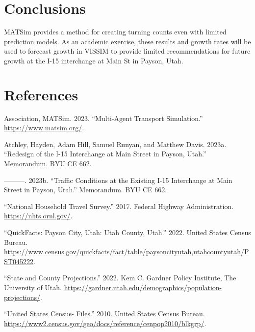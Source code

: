 \documentclass[
  letterpaper,
  DIV=11,
  numbers=noendperiod]{scrartcl}
\newlength{\cslhangindent}
\newlength{\cslentryspacingunit} %
\newenvironment{CSLReferences}[2] %
 {%
  \setlength{\parindent}{0pt}
  \ifodd #1
  \let\oldpar\par
  \def\par{\hangindent=\cslhangindent\oldpar}
  \fi
  \setlength{\parskip}{#2\cslentryspacingunit}
 }%
 {}
\begin{document}
\hypertarget{conclusions}{%
\section{Conclusions}\label{conclusions}}

MATSim provides a method for creating turning counts even with limited
prediction models. As an academic exercise, these results and growth
rates will be used to forecast growth in VISSIM to provide limited
recommendations for future growth at the I-15 interchange at Main St in
Payson, Utah.

\hypertarget{references}{%
\section{References}\label{references}}

\hypertarget{refs}{}
\begin{CSLReferences}{1}{0}
\leavevmode{}%
Association, MATSim. 2023. {``Multi-Agent Transport Simulation.''}
\url{https://www.matsim.org/}.

\leavevmode{}%
Atchley, Hayden, Adam Hill, Samuel Runyan, and Matthew Davis. 2023a.
{``{Redesign} of the {I}-15 {Interchange} at {Main} {Street} in
{Payson}, {Utah}.''} Memorandum. BYU CE 662.

\leavevmode{}%
---------. 2023b. {``Traffic {Conditions} at the {Existing} {I}-15
{Interchange} at {Main} {Street} in {Payson}, {Utah}.''} Memorandum. BYU
CE 662.

\leavevmode{}%
{``National {Household} {Travel} {Survey}.''} 2017. Federal Highway
Administration. \url{https://nhts.ornl.gov/}.

\leavevmode{}%
{``{QuickFacts}: {Payson} City, {Utah}: {Utah} {County}, {Utah}.''}
2022. United States Census Bureau.
\url{https://www.census.gov/quickfacts/fact/table/paysoncityutah,utahcountyutah/PST045222}.

\leavevmode{}%
{``State and {County} {Projections}.''} 2022. Kem C. Gardner Policy
Institute, The University of Utah.
\url{https://gardner.utah.edu/demographics/population-projections/}.

\leavevmode{}%
{``United {States} {Census}- {Files}.''} 2010. United States Census
Bureau.
\url{https://www2.census.gov/geo/docs/reference/cenpop2010/blkgrp/}.

\end{CSLReferences}
\end{document}
